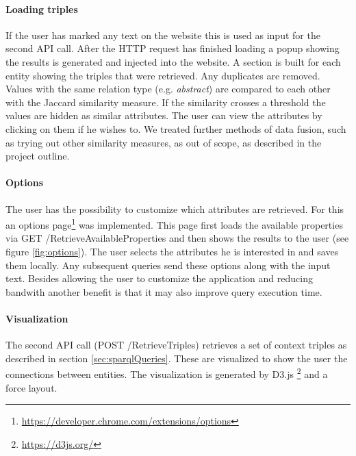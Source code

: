 \paragraph{Loading triples}
If the user has marked any text on the website this is used as input for the second API call. After the HTTP request has finished loading a popup showing the results is generated and injected into the website. A section is built for each entity showing the triples that were retrieved. Any duplicates are removed. Values with the same relation type (e.g. \textit{abstract}) are compared to each other with the Jaccard similarity measure. If the similarity crosses a threshold the values are hidden as similar attributes. The user can view the attributes by clicking on them if he wishes to. We treated further methods of data fusion, such as trying out other similarity measures, as out of scope, as described in the project outline. 


\paragraph{Options}
The user has the possibility to customize which attributes are retrieved. For this an options page\footnote{\url{https://developer.chrome.com/extensions/options}} was implemented. This page first loads the available properties via GET /RetrieveAvailableProperties and then shows the results to the user (see figure \ref{fig:options}). The user selects the attributes he is interested in and saves them locally. Any subsequent queries send these options along with the input text. Besides allowing the user to customize the application and reducing bandwith another benefit is that it may also improve query execution time. 


\paragraph{Visualization}
The second API call (POST /RetrieveTriples) retrieves a set of context triples as described in section \ref{sec:sparqlQueries}. These are visualized to show the user the connections between entities. The visualization is generated by D3.js \footnote{\url{https://d3js.org/}} and a force layout. 































